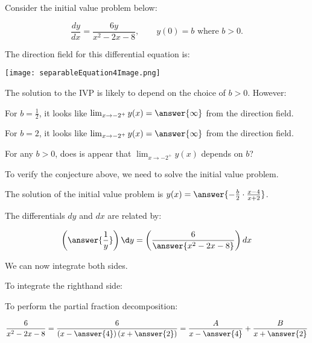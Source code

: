 \documentclass{ximera}
\author{Jim Talamo}
\begin{document}
\begin{exercise}
Consider the initial value problem below:

\[
\frac{dy}{dx} = \frac{6y}{x^2-2x-8}  , \qquad y(0)=b \textrm{ where } b>0.
\]

The direction field for this differential equation is:

 \begin{image}
  \texttt{[image: separableEquation4Image.png]}
\end{image}

\begin{exercise}
The solution to the IVP is likely to depend on the choice of $b>0$.  However:

For $b=\frac{1}{2}$, it looks like $\lim_{x\to -2^+}y(x) = \answer{\infty} $ from the direction field.

For $b=2$, it looks like $\lim_{x\to -2^+} y(x) = \answer{\infty}$ from the direction field.

For any $b>0$, does is appear that $\lim_{x\to -2^+} y(x)$ depends on $b$?
\begin{multipleChoice}
\end{multipleChoice}
\end{exercise}

\begin{exercise}
To verify the conjecture above, we need to solve the initial value problem.

The solution of the initial value problem is $y(x) = \answer{ - \frac{b}{2} \cdot \frac{x-4}{x+2} }$.

\begin{hint}
The differentials $dy$ and $dx$ are related by:

\[
\left(\answer{\frac{1}{y}} \right) \d y = \left(\frac{6}{\answer{x^2-2x-8} } \right) dx
\]

\begin{question}
We can now integrate both sides.

To integrate the righthand side:

\begin{multipleChoice}
\end{multipleChoice}

To perform the partial fraction decomposition:

\[
\frac{6}{x^2-2x-8} = \frac{6}{\left(x-\answer{4}\right)\left(x+\answer{2}\right)} = \frac{A}{x-\answer{4}}+\frac{B}{x+\answer{2}}
\]


\end{question}
\end{hint}
\end{exercise}
\end{exercise}
\end{document}
